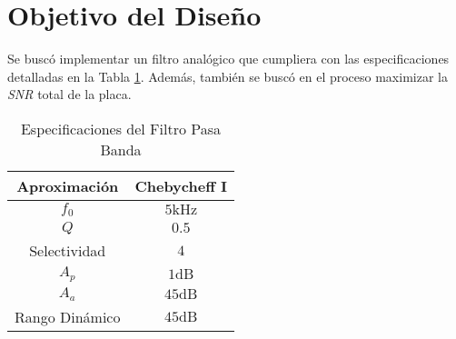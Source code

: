 \chapter*{Objetivo del Diseño}

Se buscó implementar un filtro analógico que cumpliera con las especificaciones detalladas en la Tabla \ref{tab:specs}. Además, también se buscó en el proceso maximizar la \textit{SNR} total de la placa.

\begin{table}[ht]
\begin{center}
\begin{tabular}{||c|c||}
\hline
Aproximación	&	Chebycheff I	\\
\hline
\hline
$f_0$	&	$5 \si{\kilo\hertz}$	\\
\hline
$Q$	&	$0.5$	\\
\hline
Selectividad	&	$4$	\\
\hline
$A_p$	&	$1 \si{\deci\bel}$	\\
\hline
$A_a$	&	$45 \si{\deci\bel}$	\\
\hline
Rango Dinámico	&	$45 \si{\deci\bel}$	\\
\hline
\end{tabular}
\caption{Especificaciones del Filtro Pasa Banda}
\label{tab:specs}
\end{center}
\end{table}